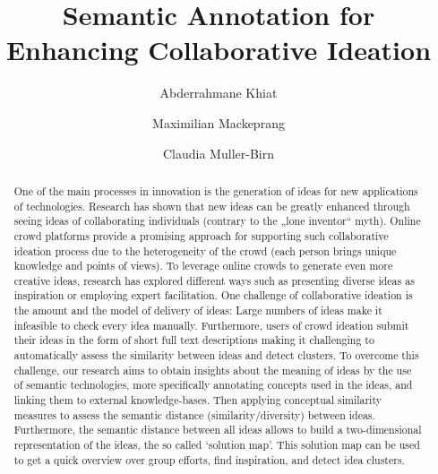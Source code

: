 \documentclass[runningheads,a4paper]{llncs}
\begin{document}
\mainmatter

\title{Semantic Annotation for Enhancing Collaborative Ideation}
\author{Abderrahmane Khiat \and
Maximilian Mackeprang \and
Claudia Muller-Birn}
\maketitle

\begin{abstract}
One of the main processes in innovation is the generation of ideas for new applications of technologies. Research has shown that new ideas can be greatly enhanced through seeing ideas of collaborating individuals (contrary to the „lone inventor`` myth). Online crowd platforms provide a promising approach for supporting such collaborative ideation process due to the heterogeneity of the crowd (each person brings unique knowledge and points of views). To leverage online crowds to generate even more creative ideas, research has explored different ways such as presenting diverse ideas as inspiration or employing expert facilitation. One challenge of collaborative ideation is the amount and the model of delivery of ideas: Large numbers of ideas make it infeasible to check every idea manually. Furthermore, users of crowd ideation submit their ideas in the form of short full text descriptions making it challenging to automatically assess the similarity between ideas and detect clusters. To overcome this challenge, our research aims to obtain insights about the meaning of ideas by the use of semantic technologies, more specifically annotating concepts used in the ideas, and linking them to external knowledge-bases. Then applying conceptual similarity measures to assess the semantic distance (similarity/diversity) between ideas. Furthermore, the semantic distance between all ideas allows to build a two-dimensional representation of the ideas, the so called `solution map'. This solution map can be used to get a quick overview over group efforts, find inspiration, and detect idea clusters.

\end{abstract}
\end{document}
